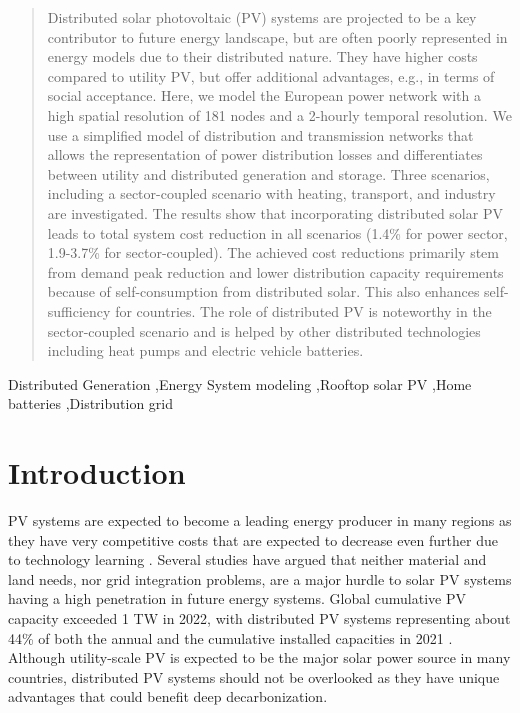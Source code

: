 \documentclass[review]{elsarticle}
\begin{document}
\begin{frontmatter}
\begin{abstract}
Distributed solar photovoltaic (PV) systems are projected to be a key contributor to future energy landscape, but are often poorly represented in energy models due to their distributed nature. They have higher costs compared to utility PV, but offer additional advantages, e.g., in terms of social acceptance. Here, we model the European power network with a high spatial resolution of 181 nodes and a 2-hourly temporal resolution. We use a simplified model of distribution and transmission networks that allows the representation of power distribution losses and differentiates between utility and distributed generation and storage. Three scenarios, including a sector-coupled scenario with heating, transport, and industry are investigated. The results show that incorporating distributed solar PV leads to total system cost reduction in all scenarios (1.4\% for power sector, 1.9-3.7\% for sector-coupled). The achieved cost reductions primarily stem from demand peak reduction and lower distribution capacity requirements because of self-consumption from distributed solar. This also enhances self-sufficiency for countries. The role of distributed PV is noteworthy in the sector-coupled scenario and is helped by other distributed technologies including heat pumps and electric vehicle batteries.
\end{abstract}



\begin{keyword}
Distributed Generation \sep Energy System modeling \sep Rooftop solar PV \sep Home batteries \sep Distribution grid

\end{keyword}

\end{frontmatter}


\section{Introduction}

PV systems are expected to become a leading energy producer in many regions as they have very competitive costs that are expected to decrease even further due to technology learning \cite{victoria_2021, IEA_2020}. Several studies \cite{victoria_2021, haegel2023photovoltaics} have argued that neither material and land needs, nor grid integration problems, are a major hurdle to solar PV systems having a high penetration in future energy systems. Global cumulative PV capacity exceeded 1 TW in 2022, with distributed PV systems representing about 44\% of both the annual and the cumulative installed capacities in 2021 \cite{IEAPVPS_2021}. Although utility-scale PV is expected to be the major solar power source in many countries, distributed PV systems should not be overlooked as they have unique advantages that could benefit deep decarbonization. 
\end{document}
